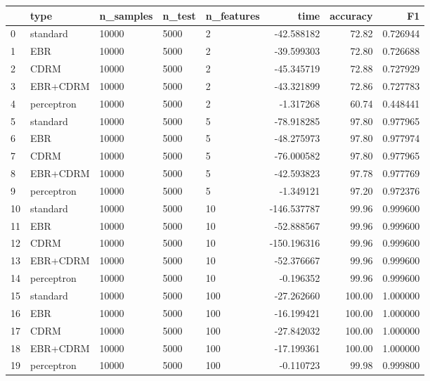 \begin{tabular}{lllllrrr}
\toprule
{} &        type & n\_samples & n\_test & n\_features &        time &  accuracy &        F1 \\
\midrule
0  &    standard &     10000 &   5000 &          2 &  -42.588182 &     72.82 &  0.726944 \\
1  &         EBR &     10000 &   5000 &          2 &  -39.599303 &     72.80 &  0.726688 \\
2  &        CDRM &     10000 &   5000 &          2 &  -45.345719 &     72.88 &  0.727929 \\
3  &    EBR+CDRM &     10000 &   5000 &          2 &  -43.321899 &     72.86 &  0.727783 \\
4  &  perceptron &     10000 &   5000 &          2 &   -1.317268 &     60.74 &  0.448441 \\
5  &    standard &     10000 &   5000 &          5 &  -78.918285 &     97.80 &  0.977965 \\
6  &         EBR &     10000 &   5000 &          5 &  -48.275973 &     97.80 &  0.977974 \\
7  &        CDRM &     10000 &   5000 &          5 &  -76.000582 &     97.80 &  0.977965 \\
8  &    EBR+CDRM &     10000 &   5000 &          5 &  -42.593823 &     97.78 &  0.977769 \\
9  &  perceptron &     10000 &   5000 &          5 &   -1.349121 &     97.20 &  0.972376 \\
10 &    standard &     10000 &   5000 &         10 & -146.537787 &     99.96 &  0.999600 \\
11 &         EBR &     10000 &   5000 &         10 &  -52.888567 &     99.96 &  0.999600 \\
12 &        CDRM &     10000 &   5000 &         10 & -150.196316 &     99.96 &  0.999600 \\
13 &    EBR+CDRM &     10000 &   5000 &         10 &  -52.376667 &     99.96 &  0.999600 \\
14 &  perceptron &     10000 &   5000 &         10 &   -0.196352 &     99.96 &  0.999600 \\
15 &    standard &     10000 &   5000 &        100 &  -27.262660 &    100.00 &  1.000000 \\
16 &         EBR &     10000 &   5000 &        100 &  -16.199421 &    100.00 &  1.000000 \\
17 &        CDRM &     10000 &   5000 &        100 &  -27.842032 &    100.00 &  1.000000 \\
18 &    EBR+CDRM &     10000 &   5000 &        100 &  -17.199361 &    100.00 &  1.000000 \\
19 &  perceptron &     10000 &   5000 &        100 &   -0.110723 &     99.98 &  0.999800 \\
\bottomrule
\end{tabular}
